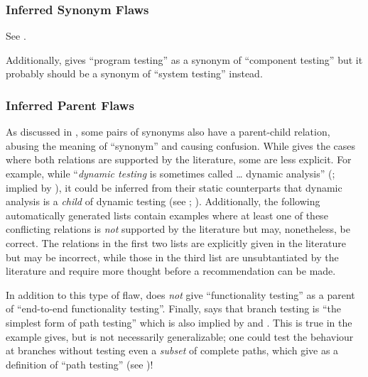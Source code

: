     \subsubsection{Inferred Synonym Flaws}
    See .

    \begin{enumerate}
        
    \end{enumerate}

    Additionally, \citet[p.~46]{Kam2008} gives ``program testing'' as a synonym
    of ``component testing'' but it probably should be a synonym of ``system
    testing'' instead.

    \subsubsection{Inferred Parent Flaws}
    \label{infParSyns}
    As discussed in , some pairs of synonyms also have a
    parent-child relation, abusing the meaning of ``synonym'' and causing
    confusion. While  gives the cases where both relations
    are supported by the literature, some are less explicit. For example, while
    ``\emph{dynamic testing} is sometimes called \dots{} dynamic analysis''
    (\citealp[p.~438]{PetersAndPedrycz2000}; implied by \citealp[p.~149]{IEEE2017}),
    it could be inferred from their static counterparts that dynamic analysis
    is a \emph{child} of dynamic testing (see
    \citealp[pp.~9, 17, 25, 28]{IEEE2022}; \citealpISTQB{}). Additionally, the
    following automatically generated lists contain examples where at least
    one of these conflicting relations is \emph{not} supported by the
    literature but may, nonetheless, be correct. The relations in the first two
    lists are explicitly given in the literature but may be incorrect, while
    those in the third list are unsubtantiated by the literature and require
    more thought before a recommendation can be made.

    

    In addition to this type of flaw, \citep[Tab.~2]{Gerrard2000a} does
    \emph{not} give ``functionality testing'' as a parent of ``end-to-end
    functionality testing''. Finally, \citet[p.~119]{Patton2006} says that
    branch testing is ``the simplest form of path testing'' which is also
    implied by \citet[Fig.~F.1]{IEEE2021} and
    \citet[p.~433]{vanVliet2000}. This is true in the example
    \citeauthor{Patton2006} gives, but is not necessarily generalizable; one
    could test the behaviour at branches without testing even a \emph{subset}
    of complete paths, which \citet[p.~316]{IEEE2017} give as a definition of
    ``path testing'' (see )!

